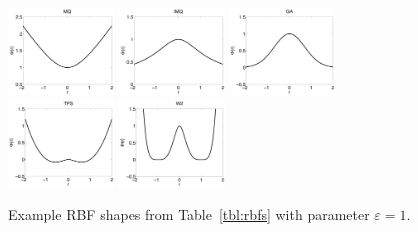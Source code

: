 \begin{figure}[t]
\centering
\includegraphics[width=0.25\textwidth]{matlab/mq_rbf.pdf}   \includegraphics[width=0.25\textwidth]{matlab/imq_rbf.pdf} 
\includegraphics[width=0.25\textwidth]{matlab/ga_rbf.pdf} \\  \includegraphics[width=0.25\textwidth]{matlab/tps_rbf.pdf} 
\includegraphics[width=0.25\textwidth]{matlab/w2_rbf.pdf}
\caption{Example RBF shapes from Table~\ref{tbl:rbfs} with parameter $\varepsilon=1$.}
\label{fig:rbf_examples}
\end{figure} 


